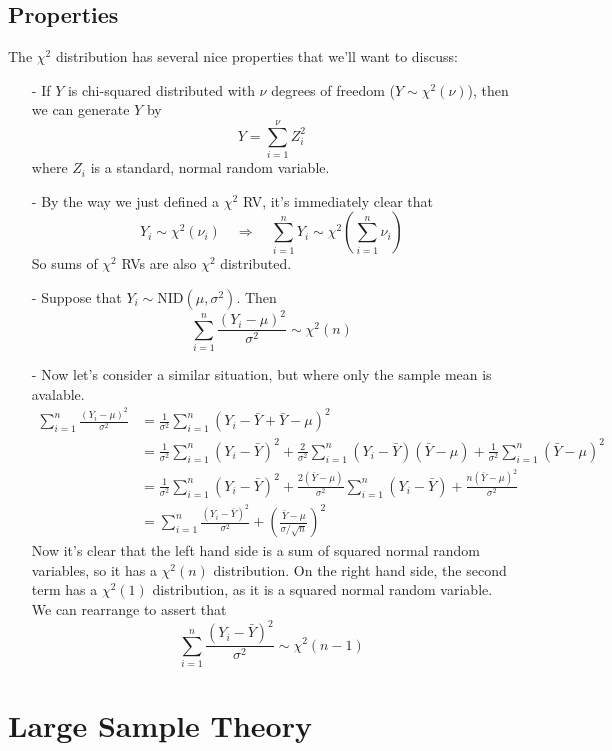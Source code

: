 \documentclass[12pt]{article}
\theoremstyle{plain}
\theoremstyle{definition}
\theoremstyle{remark}
\begin{document}
\subsection{Properties}

The $\chi^2$ distribution has several nice properties that we'll
want to discuss:
\begin{itemize}
   \item[-] If $Y$ is chi-squared distributed with $\nu$ degrees of
      freedom ($Y\sim \chi^2(\nu)$), then we can generate $Y$ by
	 \[ Y = \sum^\nu_{i=1} Z^2_i \]
      where $Z_i$ is a standard, normal random variable.
   \item[-] By the way we just defined a $\chi^2$ RV, it's immediately
      clear that
	 \[ Y_i \sim \chi^2(\nu_i) \quad \Rightarrow \quad
	    \sum^n_{i=1} Y_i \sim \chi^2\left(\sum^n_{i=1} \nu_i \right)
	    \]
      So sums of $\chi^2$ RVs are also $\chi^2$ distributed.
   \item[-] Suppose that $Y_i \sim \text{NID}(\mu,\sigma^2)$. Then
      \[ \sum^n_{i=1} \frac{(Y_i-\mu)^2}{\sigma^2}  \sim \chi^2(n) \]
   \item[-] Now let's consider a similar situation, but where
      only the sample mean is avalable.
      \begin{align*}
	 \sum^n_{i=1} \frac{(Y_i-\mu)^2}{\sigma^2} &= \frac{1}{
	    \sigma^2} \sum^n_{i=1} (Y_i - \bar{Y}+ \bar{Y}-\mu)^2 \\
	    &= \frac{1}{\sigma^2} \sum^n_{i=1}  (Y_i - \bar{Y})^2
	    + \frac{2}{\sigma^2} \sum^n_{i=1} (Y_i-\bar{Y})(\bar{Y}-\mu)
	    + \frac{1}{\sigma^2} \sum^n_{i=1} (\bar{Y}-\mu)^2 \\
	    &= \frac{1}{\sigma^2} \sum^n_{i=1}  (Y_i - \bar{Y})^2
	    + \frac{2(\bar{Y}-\mu)}{\sigma^2} \sum^n_{i=1} (Y_i-\bar{Y})
	    + \frac{n(\bar{Y}-\mu)^2 }{\sigma^2}  \\
	 &= \sum^n_{i=1}\frac{(Y_i - \bar{Y})^2 }{\sigma^2} +
	    \left(\frac{\bar{Y}-\mu }{\sigma /\sqrt{n}}\right)^2
      \end{align*}
      Now it's clear that the left hand side is a sum of squared normal
      random variables, so it has a $\chi^2(n)$ distribution. On
      the right hand side, the second term has a $\chi^2(1)$
      distribution, as it is a squared normal random variable. We
      can rearrange to assert that
	 \[ \sum^n_{i=1}\frac{(Y_i - \bar{Y})^2 }{\sigma^2}  \sim
	    \chi^2(n-1) \]
\end{itemize}


\clearpage
\section{Large Sample Theory}
\end{document}

